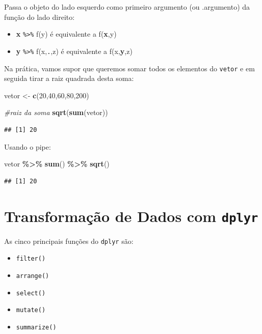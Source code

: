\documentclass[
]{book}
\newenvironment{Shaded}{\begin{snugshade}}{\end{snugshade}}
\newcommand{\CommentTok}[1]{\textcolor[rgb]{0.56,0.35,0.01}{\textit{#1}}}
\newcommand{\DecValTok}[1]{\textcolor[rgb]{0.00,0.00,0.81}{#1}}
\newcommand{\FunctionTok}[1]{\textcolor[rgb]{0.13,0.29,0.53}{\textbf{#1}}}
\newcommand{\NormalTok}[1]{#1}
\newcommand{\OtherTok}[1]{\textcolor[rgb]{0.56,0.35,0.01}{#1}}
\newcommand{\SpecialCharTok}[1]{\textcolor[rgb]{0.81,0.36,0.00}{\textbf{#1}}}
\providecommand{\tightlist}{%
  \setlength{\itemsep}{0pt}\setlength{\parskip}{0pt}}
\begin{document}
Passa o objeto do lado esquerdo como primeiro argumento (ou
.argumento) da função do lado direito:

\begin{itemize}
\item
  \textbf{x} \texttt{\%\textgreater{}\%} f(y) é equivalente a f(\textbf{x},y)
\item
  \textbf{y} \texttt{\%\textgreater{}\%} f(x,\texttt{.},z) é equivalente a f(x,\textbf{y},z)
\end{itemize}

Na prática, vamos supor que queremos somar todos os elementos do \texttt{vetor} e em seguida tirar a raiz quadrada desta soma:

\begin{Shaded}
\begin{Highlighting}[]
\NormalTok{vetor }\OtherTok{\textless{}{-}} \FunctionTok{c}\NormalTok{(}\DecValTok{20}\NormalTok{,}\DecValTok{40}\NormalTok{,}\DecValTok{60}\NormalTok{,}\DecValTok{80}\NormalTok{,}\DecValTok{200}\NormalTok{)}

\CommentTok{\#raiz da soma}
\FunctionTok{sqrt}\NormalTok{(}\FunctionTok{sum}\NormalTok{(vetor))}
\end{Highlighting}
\end{Shaded}

\begin{verbatim}
## [1] 20
\end{verbatim}

Usando o pipe:

\begin{Shaded}
\begin{Highlighting}[]
\NormalTok{vetor }\SpecialCharTok{\%\textgreater{}\%} \FunctionTok{sum}\NormalTok{() }\SpecialCharTok{\%\textgreater{}\%} \FunctionTok{sqrt}\NormalTok{()}
\end{Highlighting}
\end{Shaded}

\begin{verbatim}
## [1] 20
\end{verbatim}

\section{\texorpdfstring{Transformação de Dados com \texttt{dplyr}}{Transformação de Dados com dplyr}}\label{transformauxe7uxe3o-de-dados-com-dplyr}

As cinco principais funções do \texttt{dplyr} são:

\begin{itemize}
\tightlist
\item
  \texttt{filter()}
  \vspace{3mm}
\item
  \texttt{arrange()}
  \vspace{3mm}
\item
  \texttt{select()}
  \vspace{3mm}
\item
  \texttt{mutate()}
  \vspace{3mm}
\item
  \texttt{summarize()}
\end{itemize}
\end{document}
